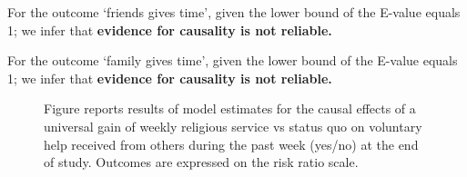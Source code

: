 \documentclass[
  singlecolumn]{article}
\begin{document}
For the outcome `friends gives time', given the lower bound of the
E-value equals 1; we infer that \textbf{evidence for causality is not
reliable.}

For the outcome `family gives time', given the lower bound of the
E-value equals 1; we infer that \textbf{evidence for causality is not
reliable.}

\newpage{}

\begin{figure}


\caption{\label{fig-3_2}Figure reports results of model estimates for
the causal effects of a universal gain of weekly religious service vs
status quo on voluntary help received from others during the past week
(yes/no) at the end of study. Outcomes are expressed on the risk ratio
scale.}

\end{figure}%
\end{document}
